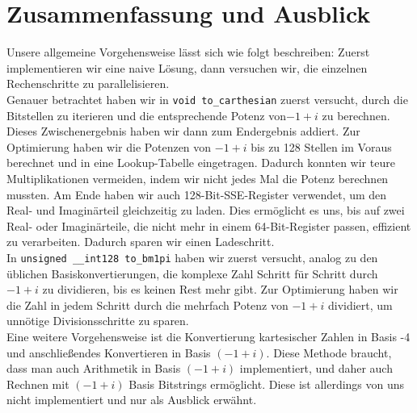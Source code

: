 \documentclass[course=erap]{aspdoc}
\begin{document}
\section{Zusammenfassung und Ausblick}
Unsere allgemeine Vorgehensweise lässt sich wie folgt beschreiben: Zuerst implementieren wir eine naive L{\"o}sung, dann versuchen wir, die einzelnen Rechenschritte zu parallelisieren.\\
Genauer betrachtet haben wir in \texttt{void to\_carthesian} zuerst versucht, durch die Bitstellen zu iterieren und die entsprechende Potenz von$-1 + i$ zu berechnen. Dieses Zwischenergebnis haben wir dann zum Endergebnis addiert. Zur Optimierung haben wir die Potenzen von $-1 + i$ bis zu 128 Stellen im Voraus berechnet und in eine Lookup-Tabelle eingetragen. Dadurch konnten wir teure Multiplikationen vermeiden, indem wir nicht jedes Mal die Potenz berechnen mussten. Am Ende haben wir auch 128-Bit-SSE-Register verwendet, um den Real- und Imaginärteil gleichzeitig zu laden. Dies ermöglicht es uns, bis auf zwei Real- oder Imaginärteile, die nicht mehr in einem 64-Bit-Register passen, effizient zu verarbeiten. Dadurch sparen wir einen Ladeschritt.\\
In \texttt{unsigned \_\_int128 to\_bm1pi} haben wir zuerst versucht, analog zu den üblichen Basiskonvertierungen, die komplexe Zahl Schritt für Schritt durch $-1 + i$ zu dividieren, bis es keinen Rest mehr gibt. Zur Optimierung haben wir die Zahl in jedem Schritt durch die mehrfach Potenz von $-1 + i$ dividiert, um unnötige Divisionsschritte zu sparen.\\
Eine weitere Vorgehensweise\cite{CBNS} ist die Konvertierung kartesischer Zahlen in Basis -4 und anschlie{\ss}endes Konvertieren in Basis $(-1 + i)$. Diese Methode braucht, dass man auch Arithmetik in Basis $(-1 + i)$ implementiert, und daher auch Rechnen mit $(-1 + i)$ Basis Bitstrings erm{\"o}glicht. Diese ist allerdings von uns nicht implementiert und nur als Ausblick erw{\"a}hnt.



\newpage


{}
\end{document}
